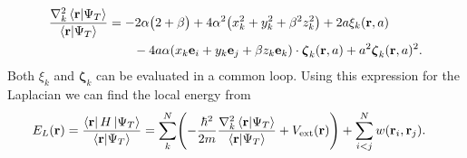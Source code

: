 \documentclass[
    a4paper, aps, twocolumn, floatfix, superscriptaddress]{revtex4-1}
\newcommand{\vf}{\mathbf}
\newcommand{\vfg}{\boldsymbol}
\newcommand{\1}{\mathds{1}}
\begin{document}
            \begin{widetext}
                \begin{align}
                    \frac{\nabla_k^2\bra{\vf{r}}\ket{\Psi_T}}
                    {\bra{\vf{r}}\ket{\Psi_T}}
                    &=
                    -2\alpha
                    \big(
                        2 + \beta
                    \bigr)
                    + 4\alpha^2
                    \bigl(
                        x_k^2 + y_k^2 + \beta^2z_k^2
                    \bigr)
                    +
                    2a\xi_k(\vf{r}, a)
                    \nonumber \\
                    &\qquad
                    -4a\alpha(x_k\vf{e}_i + y_k\vf{e}_j + \beta z_k\vf{e}_k)
                    \cdot
                    \vfg{\zeta}_k(\vf{r}, a)
                    + a^2\vfg{\zeta}_k(\vf{r}, a)^2.
                \end{align}
                Both $\xi_k$ and $\vfg{\zeta}_k$ can be evaluated in a common
                loop. Using this expression for the Laplacian we can find the
                local energy from
                \begin{align}
                    E_L(\vf{r})
                    &=
                    \frac{\bra{\vf{r}}H\ket{\Psi_T}}
                    {\bra{\vf{r}}\ket{\Psi_T}}
                    =
                    \sum_{k}^N
                    \Biggl(
                        -\frac{\hbar^2}{2m}
                        \frac{\nabla_k^2\bra{\vf{r}}\ket{\Psi_T}}
                        {\bra{\vf{r}}\ket{\Psi_T}}
                        + V_{\text{ext}}(\vf{r})
                    \Biggr)
                    +
                    \sum_{i < j}^N w(\vf{r}_i, \vf{r}_j).
                \end{align}
            \end{widetext}
\end{document}
